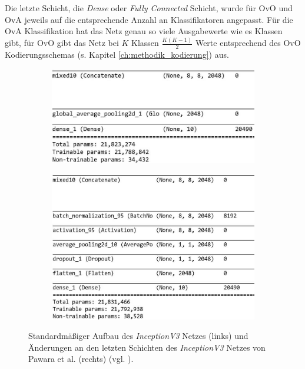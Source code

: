 Die letzte Schicht, die \textit{Dense} oder \textit{Fully Connected} Schicht, wurde für OvO und OvA jeweils auf die entsprechende Anzahl an Klassifikatoren angepasst. Für die OvA Klassifikation hat das Netz genau so viele Ausgabewerte wie es Klassen gibt, für OvO gibt das Netz bei $K$ Klassen $\frac{K(K-1)}{2}$ Werte entsprechend des OvO Kodierungsschemas (s. Kapitel \ref{ch:methodik_kodierung}) aus.

\begin{figure}[H]

\begin{subfigure}{0.48\textwidth}
\includegraphics[width=\textwidth]{img/3_inception-standard.jpg}
\end{subfigure}
\hfill
\begin{subfigure}{0.48\textwidth}
\includegraphics[width=\textwidth]{img/3_inception-pawara.jpg}
\end{subfigure}



\caption{Standardmäßiger Aufbau des \textit{InceptionV3} Netzes (links) und Änderungen an den letzten Schichten des \textit{InceptionV3} Netzes von Pawara et al. (rechts) (vgl. \cite{pawaraWebsiteCode, pawaraPaper}).}
\label{fig:inceptionAenderungen}
\end{figure}


